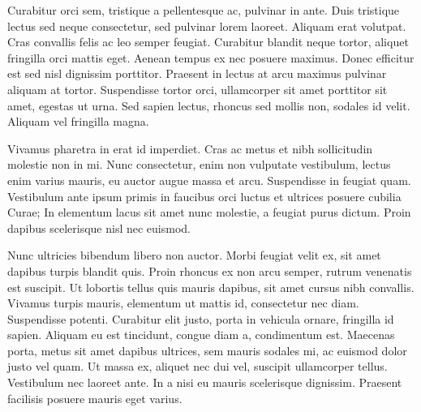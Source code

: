 \documentclass{article}
\begin{document}
Curabitur orci sem, tristique a pellentesque ac, pulvinar in ante. Duis tristique lectus sed neque consectetur, sed pulvinar lorem laoreet. Aliquam erat volutpat. Cras convallis felis ac leo semper feugiat. Curabitur blandit neque tortor, aliquet fringilla orci mattis eget. Aenean tempus ex nec posuere maximus. Donec efficitur est sed nisl dignissim porttitor. Praesent in lectus at arcu maximus pulvinar aliquam at tortor. Suspendisse tortor orci, ullamcorper sit amet porttitor sit amet, egestas ut urna. Sed sapien lectus, rhoncus sed mollis non, sodales id velit. Aliquam vel fringilla magna.

Vivamus pharetra in erat id imperdiet. Cras ac metus et nibh sollicitudin molestie non in mi. Nunc consectetur, enim non vulputate vestibulum, lectus enim varius mauris, eu auctor augue massa et arcu. Suspendisse in feugiat quam. Vestibulum ante ipsum primis in faucibus orci luctus et ultrices posuere cubilia Curae; In elementum lacus sit amet nunc molestie, a feugiat purus dictum. Proin dapibus scelerisque nisl nec euismod.

Nunc ultricies bibendum libero non auctor. Morbi feugiat velit ex, sit amet dapibus turpis blandit quis. Proin rhoncus ex non arcu semper, rutrum venenatis est suscipit. Ut lobortis tellus quis mauris dapibus, sit amet cursus nibh convallis. Vivamus turpis mauris, elementum ut mattis id, consectetur nec diam. Suspendisse potenti. Curabitur elit justo, porta in vehicula ornare, fringilla id sapien. Aliquam eu est tincidunt, congue diam a, condimentum est. Maecenas porta, metus sit amet dapibus ultrices, sem mauris sodales mi, ac euismod dolor justo vel quam. Ut massa ex, aliquet nec dui vel, suscipit ullamcorper tellus. Vestibulum nec laoreet ante. In a nisi eu mauris scelerisque dignissim. Praesent facilisis posuere mauris eget varius.
\end{document}
